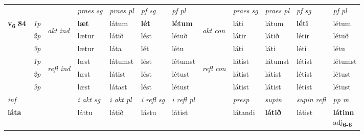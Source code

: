 \begin{longtable}[l]{X>{\footnotesize\itshape}llXXXXlXXXX}
 & &   & \textit{praes sg}  & \textit{praes pl}    & \textit{ pf sg} & \textit{pf pl} & & \textit{praes sg}  & \textit{praes pl}    & \textit{pf sg} & \textit{pf pl }  \\ \cmidrule{4-7} \cmidrule{9-12}
 \multirow{2}{*}{{{\textbf{v{\textsubscript{6}}} \Large{\textbf{84}}}}}  & 1p & \multirow{3}{*}{\begin{turn}{90}\textit{akt ind}\end{turn}} & \textbf{læt} & látum & \textbf{lét} & \textbf{létum} & \multirow{3}{*}{\begin{turn}{90}\textit{akt con}\end{turn}} &láti & látum & \textbf{léti} & létum\\*
 & 2p &  &  lætur  & látið & lést & létuð & & látir & látið & létir & létuð \\*
 & 3p &  & lætur & láta & lét & létu & & láti & láti& léti & létu \\*
\cmidrule{4-7} \cmidrule{9-12}
 & 1p & \multirow{3}{*}{\begin{turn}{90}\textit{refl ind}\end{turn}}  & læst & látumst & lést & létumst & \multirow{3}{*}{\begin{turn}{90}\textit{refl con}\end{turn}}  &látist & látumst & létist & létumst \\*
 & 2p &  & læst & látist & lést & létust & &látist & látist & létist & létust \\*
 & 3p  & & læst & látast & lést & létust & & látist & látist& létist & létust \\*
\cmidrule{4-7} \cmidrule{9-12}

   {\textit{inf}} & &  & \textit{i akt sg} & \textit{i akt pl} & \textit{i refl sg} & \textit{i refl pl} && \textit{presp} & \textit{supin} & \textit{supin refl} & \textit{pp m} \\*
  {\textbf{láta}} & && láttu  & látið & lástu & látist && látandi &  \textbf{látið} & látist & \specialcell{\textbf{látinn} \\ adj\textbf{\textsubscript{6-6}}} \\*

\midrule


\end{longtable}
